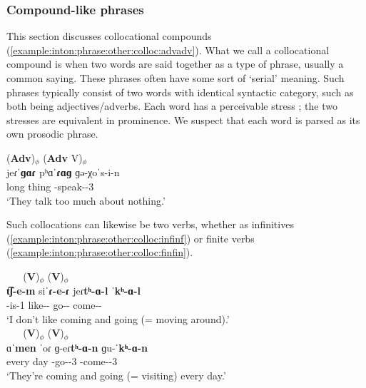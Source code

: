 \subsubsection{Compound-like phrases}\label{section:intonation:phrase:other:colloc}

This section discusses collocational compounds (\ref{example:inton:phrase:other:colloc:advadv}). What we call a collocational compound is when two words are said together as a type of phrase, usually a common saying. These phrases often have some sort of `serial' meaning.  Such phrases typically consist of two words with identical syntactic category, such as both being adjectives/adverbs. Each word has a perceivable stress \citep[222]{Gharagulyan-1974-BookArmenianOrthoepy}; the two stresses are equivalent in prominence. We suspect that each word is parsed as its own prosodic phrase. 

\begin{exe}
	\ex \glll (\textbf{Adv})$_\phi$ (\textbf{Adv} V)$_\phi$ 
	\\
	jeɾˈ\textbf{ɡɑɾ} pʰɑˈ\textbf{ɾɑɡ} ɡə-χoˈs-i-n \\
	long thing {\ind}-speak-{\thgloss}-3{\pl} \\
	\trans `They talk too much about nothing.' \label{example:inton:phrase:other:colloc:advadv}
	\\ 
	
\end{exe}

Such collocations can likewise be two verbs, whether as infinitives  (\ref{example:inton:phrase:other:colloc:infinf}) or finite verbs (\ref{example:inton:phrase:other:colloc:finfin}). 

\begin{exe}
	\ex \begin{xlist}
		\ex \glll ~ ~  (\textbf{V})$_\phi$ (\textbf{V})$_\phi$ 
		\\
		\textbf{t͡ʃ-e-m} siˈ\textbf{ɾ-e-ɾ} jeɾ\textbf{tʰ-ɑ-l} ˈ\textbf{kʰ-ɑ-l}  \\
		{\neggloss}-is-1{\sg} like-{\thgloss}-{\cn} go-{\thgloss}-{\infgloss} come-{\thgloss}-{\infgloss} \\
		\trans `I don't like coming and going (= moving around).'\label{example:inton:phrase:other:colloc:infinf}
		\\ 
		\ex \glll ~ ~  (\textbf{V})$_\phi$ (\textbf{V})$_\phi$ 
		\\
		ɑˈ\textbf{men} ˈoɾ ɡ-eɾ\textbf{tʰ-ɑ-n} ɡu-ˈ\textbf{kʰ-ɑ-n}  \\
		every day {\ind}-go-{\thgloss}-3{\pl} {\ind}-come-{\thgloss}-3{\pl} \\
		\trans `They're coming and going (= visiting) every day.' \label{example:inton:phrase:other:colloc:finfin}
		\\ 
	\end{xlist}
\end{exe}


